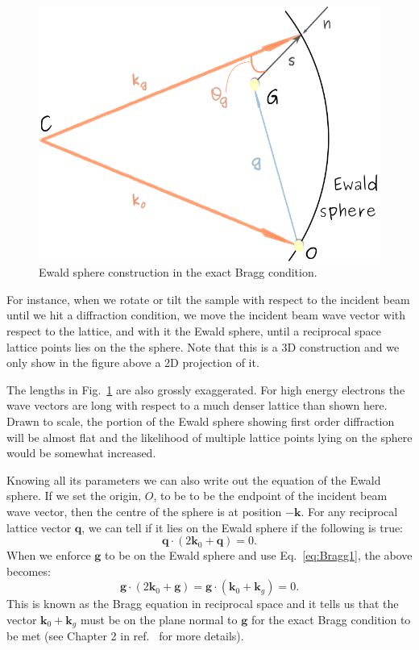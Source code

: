  \begin{figure}
    \centering
\includegraphics[width=0.52\linewidth]{Figures/EwaldSphere.png}
\caption{Ewald sphere construction in the exact Bragg condition. }
\label{Fig:Ewald}
\end{figure}

For instance, when we rotate or tilt the sample with respect to the incident beam until we hit a diffraction condition, we move the incident beam wave vector with respect to the lattice, and with it the Ewald sphere, until  a reciprocal space lattice points lies on the the sphere. Note that this is a 3D construction and we only show in the figure above a 2D projection of it.

The lengths in Fig.~\ref{Fig:Ewald} are also grossly exaggerated. For high energy electrons the wave vectors are long with respect to a much denser lattice than shown here. Drawn to scale, the portion of the Ewald sphere showing first order diffraction will be almost flat and the likelihood of multiple lattice points lying on the sphere would be somewhat increased.   



 Knowing all its parameters we can also write out the equation of the Ewald sphere. If we set the origin, $O$, to be to be the endpoint of the incident beam wave vector, then the centre of the sphere is at position $-\mathbf{k}$. For any reciprocal lattice vector $\mathbf{q}$, we can tell if it lies on the Ewald sphere if the following is true:
 \begin{equation*}
     \mathbf{q} \cdot (2 \mathbf{k}_0 + \mathbf{q})=0.
 \end{equation*}
When we enforce $\mathbf{g}$ to be on the Ewald sphere and use Eq.~\ref{eq:Bragg1}, the above becomes:
\begin{equation}
    \label{Eq:recBragg}
    \mathbf{g}\cdot (2 \mathbf{k}_0 + \mathbf{g})=\mathbf{g} \cdot (\mathbf{k}_0 + \mathbf{k}_g)=0.
\end{equation}
 This is known as the Bragg equation in reciprocal space and it tells us that the vector $\mathbf{k}_0 + \mathbf{k}_g$ must be on the plane normal to  $\mathbf{g}$ for the exact Bragg condition to be met (see Chapter 2 in  ref.~\cite{MarcTEM03} for more details). 
 




